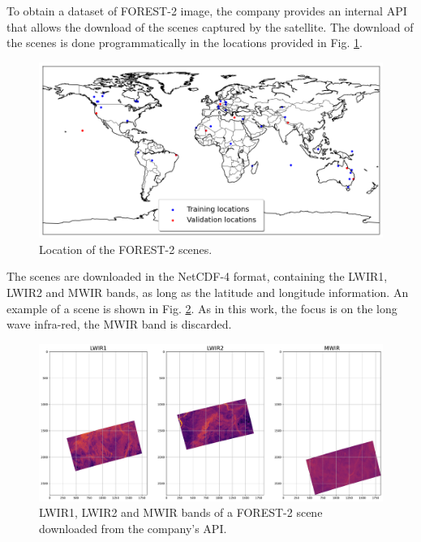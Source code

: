     To obtain a dataset of FOREST-2 image, the company provides an internal API that allows the download of the scenes captured by the satellite. 
    The download of the scenes is done programmatically in the locations provided in Fig. \ref{fig:4-forest-locations}. 

    \begin{figure}[H]
        \centering
        \includegraphics[width=\linewidth]{Includes/4-forest-locations.png}
        \caption{Location of the FOREST-2 scenes.}
        \label{fig:4-forest-locations}
    \end{figure}

    The scenes are downloaded in the NetCDF-4 format, containing the LWIR1, LWIR2 and MWIR bands, as long as the latitude and longitude information. 
    An example of a scene is shown in Fig. \ref{fig:4-forest-complete example}. 
    As in this work, the focus is on the long wave infra-red, the MWIR band is discarded.

    \begin{figure}[H]
        \centering
        \includegraphics[width=\linewidth]{Includes/4-forest2-unprocessed-bands.pdf}
        \caption{LWIR1, LWIR2 and MWIR bands of a FOREST-2 scene downloaded from the company's API.}
        \label{fig:4-forest-complete example}
    \end{figure}

